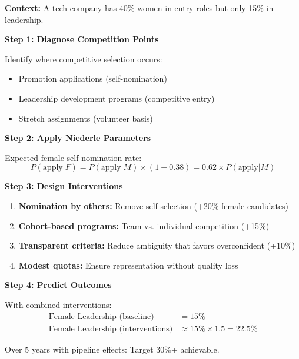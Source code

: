 \begin{tcolorbox}[colback=blue!5!white,colframe=blue!75!black,title=Application: Tech Company Leadership Pipeline]
\textbf{Context:} A tech company has 40\% women in entry roles but only 15\% in leadership.

\textbf{Step 1: Diagnose Competition Points}

Identify where competitive selection occurs:
\begin{itemize}
    \item Promotion applications (self-nomination)
    \item Leadership development programs (competitive entry)
    \item Stretch assignments (volunteer basis)
\end{itemize}

\textbf{Step 2: Apply Niederle Parameters}

Expected female self-nomination rate:
\begin{equation}
P(\text{apply} | F) = P(\text{apply} | M) \times (1 - 0.38) = 0.62 \times P(\text{apply} | M)
\end{equation}

\textbf{Step 3: Design Interventions}

\begin{enumerate}
    \item \textbf{Nomination by others:} Remove self-selection (+20\% female candidates)
    \item \textbf{Cohort-based programs:} Team vs. individual competition (+15\%)
    \item \textbf{Transparent criteria:} Reduce ambiguity that favors overconfident (+10\%)
    \item \textbf{Modest quotas:} Ensure representation without quality loss
\end{enumerate}

\textbf{Step 4: Predict Outcomes}

With combined interventions:
\begin{align}
\text{Female Leadership (baseline)} &= 15\% \\
\text{Female Leadership (interventions)} &\approx 15\% \times 1.5 = 22.5\%
\end{align}

Over 5 years with pipeline effects: Target 30\%+ achievable.
\end{tcolorbox}

